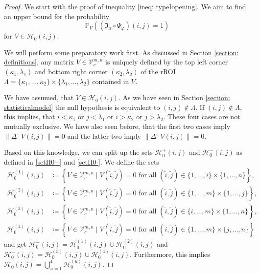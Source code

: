 \documentclass[a4paper,12pt]{article}
\newcommand{\norm}[1]{\lVert#1\rVert}
\theoremstyle{plain}
\theoremstyle{definition}
\begin{document}
\begin{proof}
	We start with the proof of inequality \eqref{ineq: typeIopening}. We aim to find an upper bound for the probability
	\begin{equation*}
		\mathbb{P}_V\left( (\mathfrak{I}_\alpha \circ \Psi_\varphi)(i, j) = 1 \right)
	\end{equation*}
	for $V \in \mathcal{H}_0(i, j)$.
	
	We will perform some preparatory work first. As discussed in Section \ref{section: definitions}, any matrix $V \in \mathcal{V}_c^{m, n}$ is uniquely defined by the top left corner $(\kappa_1, \lambda_1)$ and bottom right corner $(\kappa_2, \lambda_2)$ of the rROI $\varLambda = \{ \kappa_1, \dots, \kappa_2 \} \times \{ \lambda_1, \dots, \lambda_2 \}$ contained in $V$.
	
	We have assumed, that $V \in \mathcal{H}_0(i, j)$. As we have seen in Section \ref{section: statisticalmodel} the null hypothesis is equivalent to $(i, j) \notin \varLambda$. If $(i, j) \notin \varLambda$, this implies, that $i < \kappa_1$ or $j < \lambda_1$ or $i > \kappa_2$ or $j > \lambda_2$. These four cases are not mutually exclusive. We have also seen before, that the first two cases imply $\norm{\Delta^- V(i, j)} = 0$ and the latter two imply $\norm{\Delta^+ V(i, j)} = 0$.
	
	Based on this knowledge, we can split up the sets $\mathcal{H}_0^+(i, j)$ and $\mathcal{H}_0^-(i, j)$ as defined in \eqref{setH0+} and \eqref{setH0-}. We define the sets
	\begin{align*}
		\mathcal{H}_0^{(1)}(i, j) &\coloneqq \left\{ V \in \mathcal{V}_c^{m, n} \mid V(\tilde{i}, \tilde{j}) = 0 \textrm{ for all } (\tilde{i}, \tilde{j}) \in \{ 1, \dots, i \} \times \{ 1, \dots, n \} \right\}, \\
		\mathcal{H}_0^{(2)}(i, j) &\coloneqq \left\{ V \in \mathcal{V}_c^{m, n} \mid V(\tilde{i}, \tilde{j}) = 0 \textrm{ for all } (\tilde{i}, \tilde{j}) \in \{ 1, \dots, m \} \times \{ 1, \dots, j \} \right\}, \\
		\mathcal{H}_0^{(3)}(i, j) &\coloneqq \left\{ V \in \mathcal{V}_c^{m, n} \mid V(\tilde{i}, \tilde{j}) = 0 \textrm{ for all } (\tilde{i}, \tilde{j}) \in \{ i, \dots, m \} \times \{ 1, \dots, n \} \right\}, \\
		\mathcal{H}_0^{(4)}(i, j) &\coloneqq \left\{ V \in \mathcal{V}_c^{m, n} \mid V(\tilde{i}, \tilde{j}) = 0 \textrm{ for all } (\tilde{i}, \tilde{j}) \in \{ 1, \dots, m \} \times \{ j, \dots, n \} \right\}
	\end{align*}
	and get $\mathcal{H}_0^-(i, j) = \mathcal{H}_0^{(1)}(i, j) \cup \mathcal{H}_0^{(2)}(i, j)$ and $\mathcal{H}_0^+(i, j) = \mathcal{H}_0^{(3)}(i, j) \cup \mathcal{H}_0^{(4)}(i, j)$. Furthermore, this implies $\mathcal{H}_0(i, j) = \bigcup_{u = 1}^4 \mathcal{H}_0^{(u)}(i, j)$.
	

\end{proof}
\end{document}
